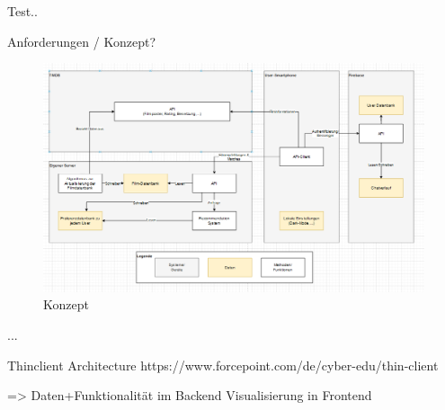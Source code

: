 Test..

Anforderungen / Konzept?

\begin{figure}[h]
\centering
\includegraphics[width=14cm]{images/Konzept.PNG}
\caption{Konzept}
\end{figure}

...

Thinclient Architecture
https://www.forcepoint.com/de/cyber-edu/thin-client

=> Daten+Funktionalität im Backend
   Visualisierung in Frontend